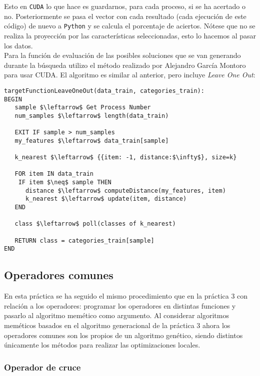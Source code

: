 \documentclass[11pt,leqno]{article}
\begin{document}
	Esto en \texttt{CUDA} lo que hace es guardarnos, para cada proceso, si se ha acertado o no. Posteriormente se pasa el vector con cada resultado (cada ejecución de este código) de nuevo a \texttt{Python} y se calcula el porcentaje de aciertos. Nótese que no se realiza la proyección por las características seleccionadas, esto lo hacemos al pasar los datos.\\
	Para la función de evaluación de las posibles soluciones que se van generando durante la búsqueda utilizo el método realizado por Alejandro García Montoro para usar CUDA. El algoritmo es similar al anterior, pero incluye \textit{Leave One Out}:

\newpage
\begin{lstlisting}[mathescape=true]
targetFunctionLeaveOneOut(data_train, categories_train):
BEGIN
   sample $\leftarrow$ Get Process Number
   num_samples $\leftarrow$ length(data_train)
   
   EXIT IF sample > num_samples
   my_features $\leftarrow$ data_train[sample]
   
   k_nearest $\leftarrow$ {{item: -1, distance:$\infty$}, size=k}
	
   FOR item IN data_train
    IF item $\neq$ sample THEN
      distance $\leftarrow$ computeDistance(my_features, item)
      k_nearest $\leftarrow$ update(item, distance)
   END
	
   class $\leftarrow$ poll(classes of k_nearest)
      
   RETURN class = categories_train[sample]
END
\end{lstlisting}

\subsection{Operadores comunes}
	
	En esta práctica se ha seguido el mismo procedimiento que en la práctica 3 con relación a los operadores: programar los operadores en distintas funciones y pasarlo al algoritmo memético como argumento. Al considerar algoritmos meméticos basados en el algoritmo generacional de la práctica 3 ahora los operadores comunes son los propios de un algoritmo genético, siendo distintos únicamente los métodos para realizar las optimizaciones locales.
	
\subsubsection{Operador de cruce}
\end{document}
